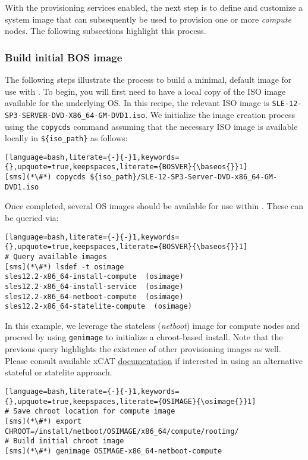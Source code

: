 
With the provisioning services enabled, the next step is to define and customize a system image that can subsequently be
used to provision one or more {\em compute} nodes. The following subsections highlight this process.

\subsubsection{Build initial BOS image} \label{sec:assemble_bos}
The following steps illustrate the process to build a minimal, default image for use with \xCAT{}. To begin, you will
first need to have a local copy of the ISO image available for the underlying OS. In this recipe, the relevant ISO image
is \texttt{SLE-12-SP3-SERVER-DVD-X86\_64-GM-DVD1.iso}. We initialize the image
creation process using the \texttt{copycds} command assuming that the necessary ISO image is available locally in 
\texttt{\$\{iso\_path\}} as follows:

\begin{lstlisting}[language=bash,literate={-}{-}1,keywords={},upquote=true,keepspaces,literate={BOSVER}{\baseos{}}1]
[sms](*\#*) copycds ${iso_path}/SLE-12-SP3-Server-DVD-x86_64-GM-DVD1.iso
\end{lstlisting}

\noindent Once completed, several OS images should be available for use within \xCAT{}. These can be queried via:

\begin{lstlisting}[language=bash,literate={-}{-}1,keywords={},upquote=true,keepspaces,literate={BOSVER}{\baseos{}}1]
# Query available images
[sms](*\#*) lsdef -t osimage
sles12.2-x86_64-install-compute  (osimage)
sles12.2-x86_64-install-service  (osimage)
sles12.2-x86_64-netboot-compute  (osimage)
sles12.2-x86_64-statelite-compute  (osimage)
\end{lstlisting}

In this example, we leverage the stateless ({\em netboot}) image for compute nodes and proceed by using
\texttt{genimage} to initialize a chroot-based install. Note that the previous query highlights the existence of other
provisioning images as well. Please consult available xCAT
\href{https://xcat-docs.readthedocs.io/en/stable/}{\color{blue} documentation} if interested in using an alternative
stateful or statelite approach.
\newpage

\begin{lstlisting}[language=bash,literate={-}{-}1,keywords={},upquote=true,keepspaces,literate={OSIMAGE}{\osimage{}}1]
# Save chroot location for compute image
[sms](*\#*) export CHROOT=/install/netboot/OSIMAGE/x86_64/compute/rootimg/
# Build initial chroot image
[sms](*\#*) genimage OSIMAGE-x86_64-netboot-compute
\end{lstlisting}
